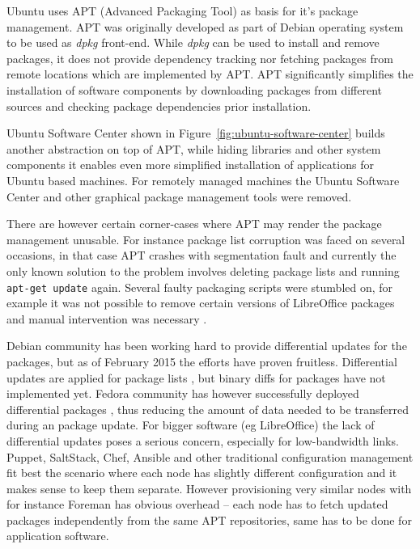 \documentclass[a4paper,11pt]{kth-mag}
\begin{document}
Ubuntu uses APT (Advanced Packaging Tool) as basis for
it's package management.
APT was originally developed as part of Debian operating system
to be used as \emph{dpkg} front-end.
While \emph{dpkg} can be used to install and remove packages,
it does not provide dependency tracking nor fetching
packages from remote locations which are implemented by APT.
APT significantly simplifies the installation of software
components by downloading packages from different sources
and checking package dependencies prior installation.

Ubuntu Software Center shown in Figure~\ref{fig:ubuntu-software-center}
builds another abstraction on top of APT,
while hiding libraries and other system components it enables
even more simplified installation of applications for Ubuntu based
machines.
For remotely managed machines the Ubuntu Software Center
and other graphical package management tools were removed.


There are however certain corner-cases where APT may render
the package management unusable.
For instance package list corruption was faced on several occasions,
in that case APT crashes with segmentation fault
\cite{apt-segfault}
and currently the only known solution to the problem
involves deleting package lists and running \lstinline!apt-get update! again.
Several faulty packaging scripts were stumbled on,
for example it was not possible to remove certain versions of LibreOffice packages
and manual intervention was necessary
\cite{upgrading-libreoffice}.

Debian community has been working hard to provide differential updates for
the packages, but as of February 2015 the efforts have proven fruitless.
Differential updates are applied for package lists
\cite{avoiding-slow-package-updates},
but binary diffs for packages have not implemented yet.
Fedora community has however successfully deployed differential packages
\cite{fedora-presto},
thus reducing the amount of data needed to be transferred during an package update.
For bigger software (eg LibreOffice) the lack of differential
updates poses a serious concern, especially for low-bandwidth links.
Puppet, SaltStack, Chef, Ansible and other traditional configuration
management fit best the scenario where each node has slightly different
configuration and it makes sense to keep them separate. However
provisioning very similar nodes with for instance Foreman has obvious
overhead -- each node has to fetch updated packages independently from
the same APT repositories, same has to be done for application software.
\end{document}
